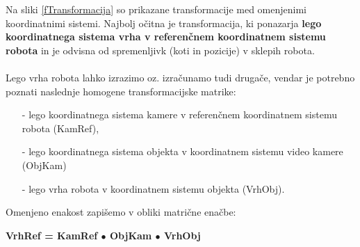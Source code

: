 \begin{mdframed}[backgroundcolor=green!20, shadow=true,roundcorner=8pt]
        \vspace{0.2cm}
Na sliki \ref{fTransformacija} so prikazane transformacije med
omenjenimi koordinatnimi sistemi. Najbolj očitna je transformacija,
ki ponazarja \textbf{lego koordinatnega sistema vrha v referenčnem
koordinatnem sistemu robota} in je odvisna od spremenljivk (koti in
pozicije) v sklepih robota.
\\
\\
Lego vrha robota lahko izrazimo oz. izračunamo tudi drugače, vendar
je potrebno poznati naslednje homogene transformacijske matrike:
\vspace*{-0.2cm} %
\begin{itemize}
    \item[-] lego koordinatnega sistema kamere v referenčnem koordinatnem sistemu robota (KamRef),\vspace*{-0.7cm} \\ %
    \item[-] lego koordinatnega sistema objekta v koordinatnem sistemu video kamere (ObjKam)\vspace*{-0.7cm}\\ %
    \item[-] lego vrha robota v koordinatnem sistemu objekta (VrhObj).\\%
\end{itemize}
\vspace*{-0.2cm} %
Omenjeno enakost zapišemo v obliki matrične
enačbe:

\begin{center}
\textbf{VrhRef = KamRef $\bullet$ ObjKam $\bullet$ VrhObj}\\ %
\end{center}
\vspace*{-0.3cm}

\end{mdframed}

